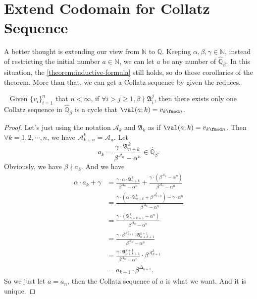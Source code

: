 \section{Extend Codomain for Collatz Sequence}\label{sec:extend-codomain-for-collatz-sequence}

A better thought is extending our view from $\mathbb{N}$ to $\mathbb{Q}$.
Keeping $\alpha, \beta, \gamma \in \mathbb{N}$, instead of restricting the initial number $a \in \mathbb{N}$, we can let $a$ be any number of $\widehat{\mathbb{Q}}_{{\beta}}$.
In this situation, the \cref{theorem:inductive-formula} still holds, so do those corollaries of the theorem.
More than that, we can get a Collatz sequence by given the reduces.

\begin{theorem}~\label{theorem:any-cycle}
    Given $\{v_{i}\}_{i=1}^{n}$ that $n < \infty$, if $\forall i>j\ge1, \beta \nmid \mathfrak{A}_i^{j}$, then there exists only one Collatz sequence in $\widehat{\mathbb{Q}}_{{\beta}}$ is a cycle that $\val(a;k) = v_{k\fmod n}$.
\end{theorem}
\begin{proof}%
    Let's just using the notation $\mathcal{A}_k$ and $\mathfrak{A}_k$ as if $\val(a;k) = v_{k\fmod n}$.\newline
    Then $\forall k = 1, 2, \cdots, n$, we have $\mathcal{A}_{k + n}^{k} = \mathcal{A}_n$.
    Let
    \[ a_k = \frac{\gamma\cdot\mathfrak{A}_{n+k}^{k}}{\beta^{\mathcal{A}_n} - \alpha^n} \in \widehat{\mathbb{Q}}_{{\beta}}. \]
    Obviously, we have $\beta \nmid a_{k}$.
    And we have
    \begin{align*}
        \alpha\cdot a_{k} + \gamma &= \frac{\gamma\cdot\alpha\cdot\mathfrak{A}_{n+k}^{k}}{\beta^{\mathcal{A}_n} - \alpha^n} + \frac{\gamma\cdot(\beta^{\mathcal{A}_n} - \alpha^n)}{\beta^{\mathcal{A}_n} - \alpha^n} \\
        &= \frac{\gamma\cdot(\alpha\cdot\mathfrak{A}_{n+k}^{k}+\beta^{\mathcal{A}_{n+k}^{k}}) - \gamma\cdot\alpha^n}{\beta^{\mathcal{A}_n} - \alpha^n} \\
        &= \frac{\gamma\cdot(\mathfrak{A}_{n+k+1}^{k} - \alpha^{n})}{\beta^{\mathcal{A}_n} - \alpha^n} \\
        &= \frac{\gamma\cdot\beta^{\mathcal{A}_{k+1}^{k}}\cdot\mathfrak{A}_{n+k+1}^{k+1}}{\beta^{\mathcal{A}_n} - \alpha^n} \\
        &= \frac{\gamma\cdot\mathfrak{A}_{n+k+1}^{k+1}}{\beta^{\mathcal{A}_n} - \alpha^n}\cdot \beta^{\mathcal{A}_{k+1}^{k}} \\
        &= a_{k+1}\cdot \beta^{\Delta_{k+1}}.
    \end{align*}
    So we just let $a = a_{n}$, then the Collatz sequence of $a$ is what we want.
    And it is unique.
\end{proof}
